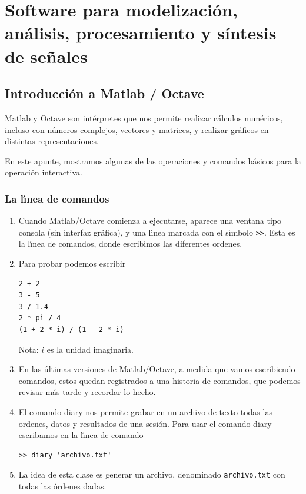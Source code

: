 \chapter{Software para modelizaci\'{o}n, análisis, procesamiento y síntesis de se\~{n}ales}

\section{Introducci\'{o}n a Matlab / Octave}

Matlab y Octave son int\'{e}rpretes que nos permite realizar c\'{a}lculos
num\'{e}ricos, incluso con n\'{u}meros complejos, vectores y matrices,
y realizar gr\'{a}ficos en distintas representaciones.

En este apunte, mostramos algunas de las operaciones y comandos b\'{a}sicos para
la operaci\'{o}n interactiva. 

\subsection{La l\'{\i}nea de comandos}

\begin{enumerate}

\item Cuando Matlab/Octave comienza a ejecutarse, aparece una ventana tipo consola 
 (sin interfaz gr\'{a}fica), y una l\'{\i}nea marcada con el s\'{\i}mbolo
  \verb->>-. Esta es la l\'{\i}nea de comandos, donde escribimos las
  diferentes ordenes.

\item Para probar podemos escribir
\begin{verbatim}
2 + 2
3 - 5
3 / 1.4
2 * pi / 4
(1 + 2 * i) / (1 - 2 * i)
\end{verbatim}
Nota: $i$ es la unidad imaginaria.

\item En las \'{u}ltimas versiones de Matlab/Octave, a medida que vamos
  escribiendo comandos, estos quedan registrados a una historia de
  comandos, que podemos revisar m\'{a}s tarde y recordar lo hecho.

\item El comando diary nos permite grabar en un archivo de texto todas las
ordenes, datos y resultados de una sesi\'{o}n. Para usar el comando
diary escribamos en la l\'{\i}nea de comando
\begin{verbatim}
>> diary 'archivo.txt'
\end{verbatim}

\item La idea de esta clase es generar un archivo, denominado
  \verb-archivo.txt- con todas las \'{o}rdenes dadas.

\end{enumerate}

